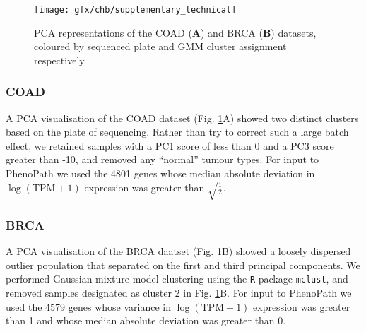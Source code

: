 
\begin{figure}
  \centering
\texttt{[image: gfx/chb/supplementary\_technical]}
\caption{PCA representations of the COAD (\textbf{A}) and BRCA (\textbf{B}) datasets, coloured by sequenced plate and GMM cluster assignment respectively.} \label{fig:technical}
\end{figure}

\subsubsection{COAD}

A PCA visualisation of the COAD dataset (Fig. \ref{fig:technical}A) showed two distinct clusters based on the plate of sequencing. Rather than try to correct such a large batch effect, we retained samples with a PC1 score of less than 0 and a PC3 score greater than -10, and removed any ``normal'' tumour types. For input to PhenoPath we used the 4801 genes whose median absolute deviation in $\log(\text{TPM} + 1)$ expression was greater than $\sqrt{\frac{1}{2}}$.

\subsubsection{BRCA}

A PCA visualisation of the BRCA daatset (Fig. \ref{fig:technical}B) showed a loosely dispersed outlier population that separated on the first and third principal components. We performed Gaussian mixture model clustering using the \texttt{R} package \texttt{mclust}\cite{Fraley_undated-ug}, and removed samples designated as cluster 2 in Fig. \ref{fig:technical}B. For input to PhenoPath we used the 4579 genes whose variance in $\log(\text{TPM} + 1)$ expression was greater than 1 and whose median absolute deviation was greater than 0.
